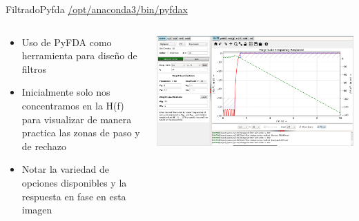 \begin{frame}[t]{Filtrado}{Pyfda \href{/opt/anaconda3/bin/pyfdax}{/opt/anaconda3/bin/pyfdax}}
   \begin{columns}[t]
      \footnotesize
      \begin{column}{.4\textwidth}
         \begin{itemize}
            \item{Uso de PyFDA como herramienta para diseño de filtros}
            \item{Inicialmente solo nos concentramos en la H(f) para visualizar de manera practica las zonas de paso y de rechazo}
            \item{Notar la variedad de opciones disponibles y la respuesta en fase en esta imagen}
         \end{itemize}
      \end{column}
      \hspace{2pt}
      \vrule
      \hspace{2pt}
      \begin{column}{.6\textwidth}
         \center\includegraphics[width=1.00\textwidth]{5_clase/pyfda2}
      \end{column}
      \hspace{2pt}
   \end{columns}
   \vfill
\end{frame}
